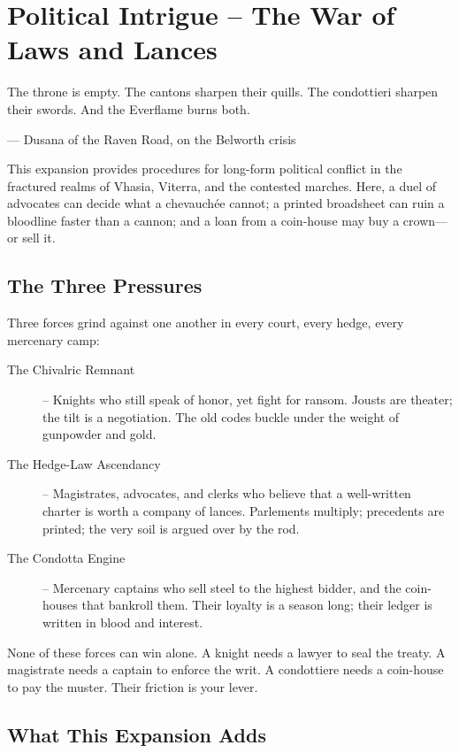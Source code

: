 \documentclass[11pt]{article}
\begin{document}
\tableofcontents
\newpage


\chapter{Political Intrigue -- The War of Laws and Lances}
\label{ch:political-intrigue}

\epigraph{The throne is empty. The cantons sharpen their quills. The condottieri sharpen their swords. And the Everflame burns both.}{--- Dusana of the Raven Road, on the Belworth crisis}

This expansion provides procedures for long-form political conflict in the fractured realms of Vhasia, Viterra, and the contested marches. Here, a duel of advocates can decide what a chevauchée cannot; a printed broadsheet can ruin a bloodline faster than a cannon; and a loan from a coin-house may buy a crown---or sell it.

\section*{The Three Pressures}

Three forces grind against one another in every court, every hedge, every mercenary camp:

\begin{description}
    \item[The Chivalric Remnant] -- Knights who still speak of honor, yet fight for ransom. Jousts are theater; the tilt is a negotiation. The old codes buckle under the weight of gunpowder and gold.
    \item[The Hedge-Law Ascendancy] -- Magistrates, advocates, and clerks who believe that a well-written charter is worth a company of lances. Parlements multiply; precedents are printed; the very soil is argued over by the rod.
    \item[The Condotta Engine] -- Mercenary captains who sell steel to the highest bidder, and the coin-houses that bankroll them. Their loyalty is a season long; their ledger is written in blood and interest.
\end{description}

None of these forces can win alone. A knight needs a lawyer to seal the treaty. A magistrate needs a captain to enforce the writ. A condottiere needs a coin-house to pay the muster. Their friction is your lever.

\section*{What This Expansion Adds}
\end{document}
